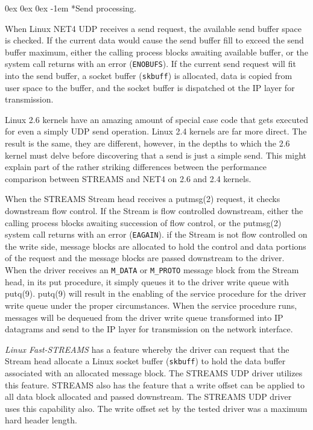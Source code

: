\documentclass[letterpaper,final,notitlepage,twocolumn,10pt,twoside]{article}
\makeatletter
\let\normalsize\small
\let\small\footnotesize
\let\footnotesize\scriptsize
\let\scriptsize\tiny
\renewcommand\subparagraph{\@startsection{subparagraph}{5}{\parindent}%
                                       {0ex \@plus 0ex \@minus 0ex}%
                                       {-1em}%
                                      {\normalfont\normalsize\bfseries\slshape}}
\makeatother
\begin{document}
\subparagraph*{Send processing.}

When Linux NET4 UDP receives a send request, the available send buffer space
is checked.  If the current data would cause the send buffer fill to exceed
the send buffer maximum, either the calling process blocks awaiting available
buffer, or the system call returns with an error (\texttt{ENOBUFS}).  If the
current send request will fit into the send buffer, a socket buffer
(\texttt{skbuff}) is allocated, data is copied from user space to the buffer,
and the socket buffer is dispatched ot the IP layer for transmission.

Linux 2.6 kernels have an amazing amount of special case code that gets
executed for even a simply UDP send operation.  Linux 2.4 kernels are far more
direct.  The result is the same, they are different, however, in the depths to
which the 2.6 kernel must delve before discovering that a send is just a
simple send.  This might explain part of the rather striking differences
between the performance comparison between STREAMS and NET4 on 2.6 and 2.4
kernels.

When the STREAMS Stream head receives a putmsg(2) request, it checks
downstream flow control.  If the Stream is flow controlled downstream, either
the calling process blocks awaiting succession of flow control, or the
putmsg(2) system call returns with an error (\texttt{EAGAIN}).  if the Stream
is not flow controlled on the write side, message blocks are allocated to hold
the control and data portions of the request and the message blocks are passed
downstream to the driver.  When the driver receives an \texttt{M\_DATA} or
\texttt{M\_PROTO} message block from the Stream head, in its put procedure, it
simply queues it to the driver write queue with putq(9).  putq(9) will result
in the enabling of the service procedure for the driver write queue under the
proper circumstances.  When the service procedure runs, messages will be
dequeued from the driver write queue transformed into IP datagrams and send to
the IP layer for transmission on the network interface.

\textsl{Linux Fast-STREAMS} has a feature whereby the driver can request that
the Stream head allocate a Linux socket buffer (\texttt{skbuff}) to hold the
data buffer associated with an allocated message block.  The STREAMS UDP
driver utilizes this feature.  STREAMS also has the feature that a write
offset can be applied to all data block allocated and passed downstream.  The
STREAMS UDP driver uses this capability also.  The write offset set by the
tested driver was a maximum hard header length.
\end{document}
